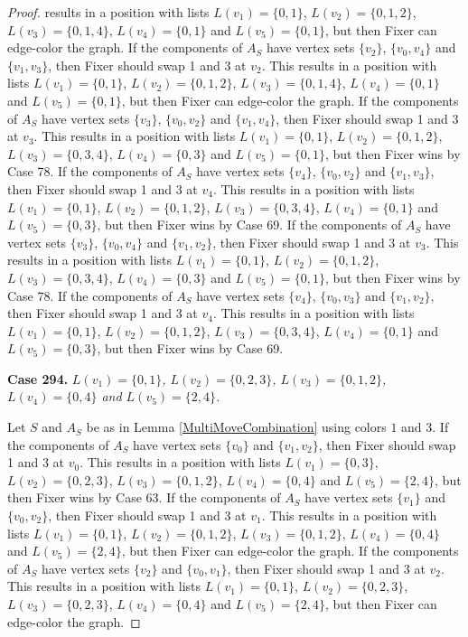 \documentclass[12pt]{amsart}
\theoremstyle{plain}
\theoremstyle{definition}
\theoremstyle{remark}
\begin{document}
\begin{proof}
results in a position with lists $L(v_1) = \{0, 1\}$, $L(v_2) = \{0, 1, 2\}$, $L(v_3) = \{0, 1, 4\}$, $L(v_4) = \{0, 1\}$ and $L(v_5) = \{0, 1\}$, but then Fixer can edge-color the graph. If the components of $A_S$ have vertex sets $\{v_2\}$, $\{v_0, v_4\}$ and $\{v_1, v_3\}$, then Fixer should swap 1 and 3 at $v_2$. This results in a position with lists $L(v_1) = \{0, 1\}$, $L(v_2) = \{0, 1, 2\}$, $L(v_3) = \{0, 1, 4\}$, $L(v_4) = \{0, 1\}$ and $L(v_5) = \{0, 1\}$, but then Fixer can edge-color the graph. If the components of $A_S$ have vertex sets $\{v_3\}$, $\{v_0, v_2\}$ and $\{v_1, v_4\}$, then Fixer should swap 1 and 3 at $v_3$. This results in a position with lists $L(v_1) = \{0, 1\}$, $L(v_2) = \{0, 1, 2\}$, $L(v_3) = \{0, 3, 4\}$, $L(v_4) = \{0, 3\}$ and $L(v_5) = \{0, 1\}$, but then Fixer wins by Case 78. If the components of $A_S$ have vertex sets $\{v_4\}$, $\{v_0, v_2\}$ and $\{v_1, v_3\}$, then Fixer should swap 1 and 3 at $v_4$. This results in a position with lists $L(v_1) = \{0, 1\}$, $L(v_2) = \{0, 1, 2\}$, $L(v_3) = \{0, 3, 4\}$, $L(v_4) = \{0, 1\}$ and $L(v_5) = \{0, 3\}$, but then Fixer wins by Case 69. If the components of $A_S$ have vertex sets $\{v_3\}$, $\{v_0, v_4\}$ and $\{v_1, v_2\}$, then Fixer should swap 1 and 3 at $v_3$. This results in a position with lists $L(v_1) = \{0, 1\}$, $L(v_2) = \{0, 1, 2\}$, $L(v_3) = \{0, 3, 4\}$, $L(v_4) = \{0, 3\}$ and $L(v_5) = \{0, 1\}$, but then Fixer wins by Case 78. If the components of $A_S$ have vertex sets $\{v_4\}$, $\{v_0, v_3\}$ and $\{v_1, v_2\}$, then Fixer should swap 1 and 3 at $v_4$. This results in a position with lists $L(v_1) = \{0, 1\}$, $L(v_2) = \{0, 1, 2\}$, $L(v_3) = \{0, 3, 4\}$, $L(v_4) = \{0, 1\}$ and $L(v_5) = \{0, 3\}$, but then Fixer wins by Case 69. 

\noindent\textbf{Case 294.  }\textit{$L(v_1) = \{0, 1\}$, $L(v_2) = \{0, 2, 3\}$, $L(v_3) = \{0, 1, 2\}$, $L(v_4) = \{0, 4\}$ and $L(v_5) = \{2, 4\}$.}

Let $S$ and $A_S$ be as in Lemma \ref{MultiMoveCombination} using colors $1$ and $3$. If the components of $A_S$ have vertex sets $\{v_0\}$ and $\{v_1, v_2\}$, then Fixer should swap 1 and 3 at $v_0$. This results in a position with lists $L(v_1) = \{0, 3\}$, $L(v_2) = \{0, 2, 3\}$, $L(v_3) = \{0, 1, 2\}$, $L(v_4) = \{0, 4\}$ and $L(v_5) = \{2, 4\}$, but then Fixer wins by Case 63. If the components of $A_S$ have vertex sets $\{v_1\}$ and $\{v_0, v_2\}$, then Fixer should swap 1 and 3 at $v_1$. This results in a position with lists $L(v_1) = \{0, 1\}$, $L(v_2) = \{0, 1, 2\}$, $L(v_3) = \{0, 1, 2\}$, $L(v_4) = \{0, 4\}$ and $L(v_5) = \{2, 4\}$, but then Fixer can edge-color the graph. If the components of $A_S$ have vertex sets $\{v_2\}$ and $\{v_0, v_1\}$, then Fixer should swap 1 and 3 at $v_2$. This results in a position with lists $L(v_1) = \{0, 1\}$, $L(v_2) = \{0, 2, 3\}$, $L(v_3) = \{0, 2, 3\}$, $L(v_4) = \{0, 4\}$ and $L(v_5) = \{2, 4\}$, but then Fixer can edge-color the graph. 


\end{proof}
\end{document}
